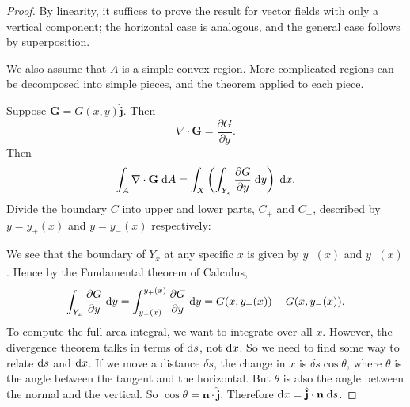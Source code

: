 \documentclass[a4paper]{article}
\begin{document}
\begin{proof}
  By linearity, it suffices to prove the result for vector fields with only a vertical component; the horizontal case is analogous, and the general case follows by superposition.

  We also assume that $A$ is a simple convex region. More complicated regions can be decomposed into simple pieces, and the theorem applied to each piece.

  Suppose $\mathbf{G} = G(x, y)\hat{\mathbf{j}}$. Then
  \[
    \nabla \cdot \mathbf{G} = \frac{\partial G}{\partial y}.
  \]
  Then
  \[
    \int_A \nabla\cdot \mathbf{G}\;\mathrm{d} A = \int_X \left(\int_{Y_x}\frac{\partial G}{\partial y}\;\mathrm{d} y\right)\;\mathrm{d} x.
  \]
  Divide the boundary $C$ into upper and lower parts, $C_+$ and $C_-$, described by $y = y_+(x)$ and $y = y_-(x)$ respectively:
  \begin{center}
  \end{center}
  We see that the boundary of $Y_x$ at any specific $x$ is given by $y_-(x)$ and $y_+(x)$. Hence by the Fundamental theorem of Calculus,
  \[
    \int_{Y_x}\frac{\partial G}{\partial y}\;\mathrm{d} y = \int_{y_-(x)}^{y_+(x)} \frac{\partial G}{\partial y}\;\mathrm{d} y = G(x, y_+(x)) - G(x, y_-(x)).
  \]
  To compute the full area integral, we want to integrate over all $x$. However, the divergence theorem talks in terms of $\mathrm{d} s$, not $\mathrm{d} x$. So we need to find some way to relate $\mathrm{d} s$ and $\mathrm{d} x$. If we move a distance $\delta s$, the change in $x$ is $\delta s\cos \theta$, where $\theta$ is the angle between the tangent and the horizontal. But $\theta$ is also the angle between the normal and the vertical. So $\cos \theta = \mathbf{n}\cdot \hat{\mathbf{j}}$. Therefore $\mathrm{d} x = \hat{\mathbf{j}}\cdot \mathbf{n}\;\mathrm{d} s$.


\end{proof}
\end{document}
